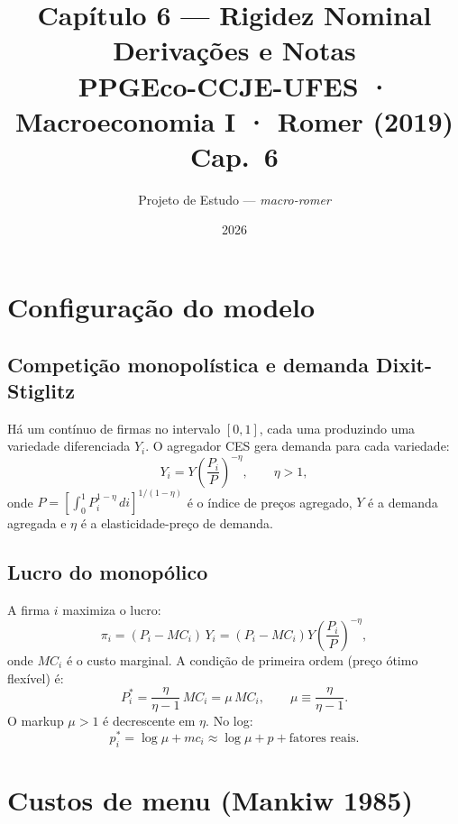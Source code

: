 \documentclass[11pt,a4paper]{article}
\title{\textbf{Capítulo 6 --- Rigidez Nominal}\\[4pt]
       {\large Derivações e Notas}\\[2pt]
       {\normalsize PPGEco-CCJE-UFES · Macroeconomia I · Romer (2019) Cap.\ 6}}
\author{Projeto de Estudo --- \textit{macro-romer}}
\date{2026}
\begin{document}
\maketitle
\tableofcontents
\bigskip

\section{Configuração do modelo}

\subsection{Competição monopolística e demanda Dixit-Stiglitz}

Há um contínuo de firmas no intervalo $[0,1]$, cada uma produzindo uma
variedade diferenciada $Y_i$.  O agregador CES gera demanda para cada
variedade:
\begin{equation}\label{eq:demand}
  Y_i = Y\!\left(\frac{P_i}{P}\right)^{-\eta}, \qquad \eta > 1,
\end{equation}
onde $P = \left[\int_0^1 P_i^{1-\eta}\,di\right]^{1/(1-\eta)}$ é o índice
de preços agregado, $Y$ é a demanda agregada e $\eta$ é a elasticidade-preço
de demanda.

\subsection{Lucro do monopólico}

A firma $i$ maximiza o lucro:
\begin{equation}
  \pi_i = (P_i - MC_i)\,Y_i = \left(P_i - MC_i\right)\!Y\!\left(\frac{P_i}{P}\right)^{-\eta},
\end{equation}
onde $MC_i$ é o custo marginal.  A condição de primeira ordem (preço ótimo
flexível) é:
\begin{equation}\label{eq:optimal_price}
  P_i^* = \frac{\eta}{\eta-1}\,MC_i = \mu\,MC_i, \qquad \mu \equiv \frac{\eta}{\eta-1}.
\end{equation}
O markup $\mu > 1$ é decrescente em $\eta$.  No log:
\begin{equation}
  p_i^* = \log\mu + mc_i \approx \log\mu + p + \text{fatores reais}.
\end{equation}

\section{Custos de menu (Mankiw 1985)}
\end{document}
